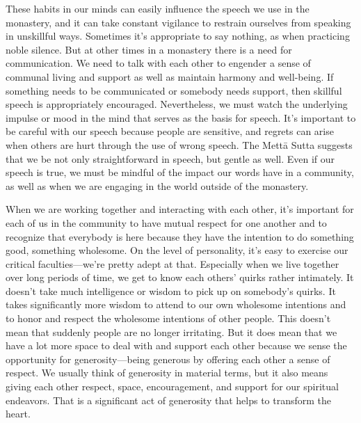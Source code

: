 These habits in our minds can easily influence the speech we use in the 
monastery, and it can take constant vigilance to restrain ourselves 
from speaking in unskillful ways. Sometimes it's appropriate to say 
nothing, as when practicing noble silence. But at other times in a 
monastery there is a need for communication. We need to talk with each 
other to engender a sense of communal living and support as well as 
maintain harmony and well-being. If something needs to be communicated 
or somebody needs support, then skillful speech is appropriately 
encouraged. Nevertheless, we must watch the underlying impulse or mood 
in the mind that serves as the basis for speech. It's important to be 
careful with our speech because people are sensitive, and regrets can 
arise when others are hurt through the use of wrong speech. The Mettā 
Sutta suggests that we be not only straightforward in speech, but 
gentle as well. Even if our speech is true, we must be mindful of the 
impact our words have in a community, as well as when we are engaging 
in the world outside of the monastery.


When we are working together and interacting with each other, it's 
important for each of us in the community to have mutual respect for 
one another and to recognize that everybody is here because they have 
the intention to do something good, something wholesome. On the level 
of personality, it's easy to exercise our critical faculties---we're 
pretty adept at that. Especially when we live together over long 
periods of time, we get to know each others' quirks rather intimately. 
It doesn't take much intelligence or wisdom to pick up on somebody's 
quirks. It takes significantly more wisdom to attend to our own 
wholesome intentions and to honor and respect the wholesome intentions 
of other people. This doesn't mean that suddenly people are no longer 
irritating. But it does mean that we have a lot more space to deal with 
and support each other because we sense the opportunity for 
generosity---being generous by offering each other a sense of respect. 
We usually think of generosity in material terms, but it also means 
giving each other respect, space, encouragement, and support for our 
spiritual endeavors. That is a significant act of generosity that helps 
to transform the heart.


